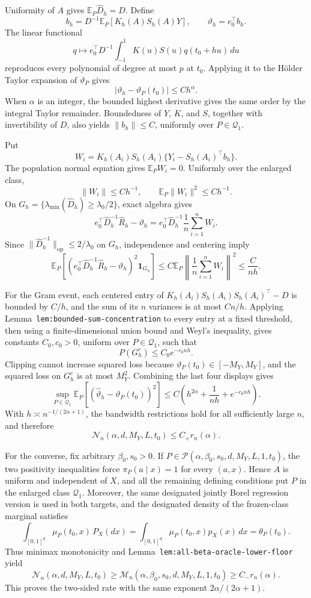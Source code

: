 Uniformity of \(A\) gives \(\mathbb E_P\widehat D_h=D\). Define
\[
b_h=D^{-1}\mathbb E_P[K_h(A)S_h(A)Y],
\qquad
\vartheta_h=e_0^\top b_h.
\]
The linear functional
\[
q\longmapsto e_0^\top D^{-1}
\int_{-1}^1K(u)S(u)q(t_0+hu)\,du
\]
reproduces every polynomial of degree at most \(p\) at \(t_0\). Applying it to the H\"older Taylor expansion of \(\vartheta_P\) gives
\[
\lvert\vartheta_h-\vartheta_P(t_0)\rvert\le Ch^\alpha.
\]
When \(\alpha\) is an integer, the bounded highest derivative gives the same order by the integral Taylor remainder. Boundedness of \(Y\), \(K\), and \(S\), together with invertibility of \(D\), also yields \(\lVert b_h\rVert\le C\), uniformly over \(P\in\mathcal Q_1\).

Put
\[
W_i=K_h(A_i)S_h(A_i)\{Y_i-S_h(A_i)^\top b_h\}.
\]
The population normal equation gives \(\mathbb E_PW_i=0\). Uniformly over the enlarged class,
\[
\lVert W_i\rVert\le C h^{-1},
\qquad
\mathbb E_P\lVert W_i\rVert^2\le C h^{-1}.
\]
On \(G_h=\{\lambda_{\min}(\widehat D_h)\ge\lambda_0/2\}\), exact algebra gives
\[
e_0^\top\widehat D_h^{-1}\widehat R_h-\vartheta_h
=e_0^\top\widehat D_h^{-1}\frac1n\sum_{i=1}^nW_i.
\]
Since \(\lVert\widehat D_h^{-1}\rVert_{\mathrm{op}}\le2/\lambda_0\) on \(G_h\), independence and centering imply
\[
\mathbb E_P\left[
\left(e_0^\top\widehat D_h^{-1}\widehat R_h-\vartheta_h\right)^2
\mathbf 1_{G_h}
\right]
\le
C\mathbb E_P\left\lVert\frac1n\sum_{i=1}^nW_i\right\rVert^2
\le\frac{C}{nh}.
\]

For the Gram event, each centered entry of
\(K_h(A_i)S_h(A_i)S_h(A_i)^\top-D\) is bounded by \(C/h\), and the sum of its \(n\) variances is at most \(Cn/h\). Applying Lemma~\texttt{lem:bounded-sum-concentration} to every entry at a fixed threshold, then using a finite-dimensional union bound and Weyl's inequality, gives constants \(C_0,c_0>0\), uniform over \(P\in\mathcal Q_1\), such that
\[
P(G_h^c)\le C_0e^{-c_0nh}.
\]
Clipping cannot increase squared loss because \(\vartheta_P(t_0)\in[-M_Y,M_Y]\), and the squared loss on \(G_h^c\) is at most \(M_Y^2\). Combining the last four displays gives
\[
\sup_{P\in\mathcal Q_1}
\mathbb E_P[(\widehat\vartheta_h-\vartheta_P(t_0))^2]
\le C\left(h^{2\alpha}+\frac1{nh}+e^{-c_0nh}\right).
\]
With \(h\asymp n^{-1/(2\alpha+1)}\), the bandwidth restrictions hold for all sufficiently large \(n\), and therefore
\[
\mathcal N_n(\alpha,d,M_Y,L,t_0)\le C_+r_n(\alpha).
\]

For the converse, fix arbitrary \(\beta_0,s_0>0\). If \(P\in\mathcal P(\alpha,\beta_0,s_0,d,M_Y,L,1,t_0)\), the two positivity inequalities force \(\pi_P(a\mid x)=1\) for every \((a,x)\). Hence \(A\) is uniform and independent of \(X\), and all the remaining defining conditions put \(P\) in the enlarged class \(\mathcal Q_1\). Moreover, the same designated jointly Borel regression version is used in both targets, and the designated density of the frozen-class marginal satisfies
\[
\int_{[0,1]^d}\mu_P(t_0,x)\,P_X(dx)
=
\int_{[0,1]^d}\mu_P(t_0,x)p_X(x)\,dx
=
\theta_P(t_0).
\]
Thus minimax monotonicity and Lemma~\texttt{lem:all-beta-oracle-lower-floor} yield
\[
\mathcal N_n(\alpha,d,M_Y,L,t_0)
\ge
\mathcal M_n(\alpha,\beta_0,s_0,d,M_Y,L,1,t_0)
\ge C_-r_n(\alpha).
\]
This proves the two-sided rate with the same exponent \(2\alpha/(2\alpha+1)\).

